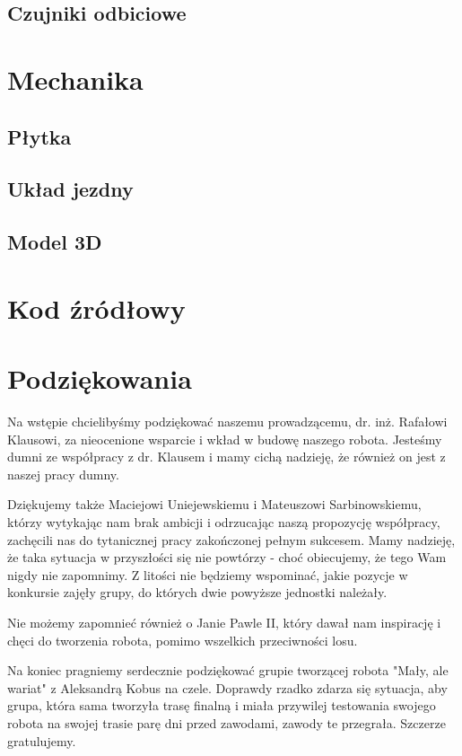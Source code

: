 \documentclass{article}
\begin{document}
\subsection{Czujniki odbiciowe}


\section{Mechanika}

\subsection{Płytka}


\subsection{Układ jezdny}


\subsection{Model 3D}

\section{Kod źródłowy}



\section{Podziękowania}

Na wstępie chcielibyśmy podziękować naszemu prowadzącemu, dr. inż. Rafałowi Klausowi,  za nieocenione wsparcie i wkład w budowę naszego robota. Jesteśmy dumni ze współpracy z dr. Klausem i mamy cichą nadzieję, że również on jest z naszej pracy dumny.

Dziękujemy także Maciejowi Uniejewskiemu i Mateuszowi Sarbinowskiemu, którzy  wytykając nam brak ambicji i odrzucając naszą propozycję współpracy, zachęcili nas do tytanicznej pracy zakończonej pełnym sukcesem. Mamy nadzieję, że taka sytuacja w przyszłości się nie powtórzy - choć obiecujemy, że tego Wam nigdy nie zapomnimy. Z litości nie będziemy wspominać, jakie pozycje w konkursie zajęły grupy, do których dwie powyższe jednostki należały.

Nie możemy zapomnieć również o Janie Pawle II, który dawał nam inspirację i chęci do tworzenia robota, pomimo wszelkich przeciwności losu.

Na koniec pragniemy serdecznie podziękować grupie tworzącej robota "Mały, ale wariat" z Aleksandrą Kobus na czele. Doprawdy rzadko zdarza się sytuacja, aby grupa, która sama tworzyła trasę finalną i miała przywilej testowania swojego robota na swojej trasie parę dni przed zawodami, zawody te przegrała. Szczerze gratulujemy.


\end{document}
